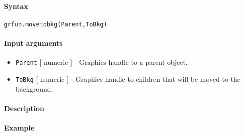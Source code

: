 


	\paragraph{Syntax}\label{syntax}

\begin{verbatim}
grfun.movetobkg(Parent,ToBkg)
\end{verbatim}

\paragraph{Input arguments}\label{input-arguments}

\begin{itemize}
\item
  \texttt{Parent} {[} numeric {]} - Graphics handle to a parent object.
\item
  \texttt{ToBkg} {[} numeric {]} - Graphics handle to children that will
  be moved to the background.
\end{itemize}

\paragraph{Description}\label{description}

\paragraph{Example}\label{example}


